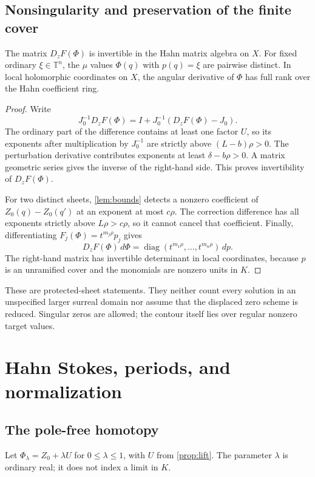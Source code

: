 \documentclass[11pt,letterpaper]{article}
\theoremstyle{definition}
\theoremstyle{remark}
\newcommand{\T}{\mathbb T}\newcommand{\D}{\mathbb D}
\numberwithin{equation}{section}
\begin{document}
\subsection{Nonsingularity and preservation of the finite cover}
\begin{corollary}\label{cor:sheets}
The matrix $D_zF(\Phi)$ is invertible in the Hahn matrix algebra on $X$.
For fixed ordinary $\xi\in\T^n$, the $\mu$ values $\Phi(q)$ with
$p(q)=\xi$ are pairwise distinct. In local holomorphic coordinates on $X$,
the angular derivative of $\Phi$ has full rank over the Hahn coefficient ring.
\end{corollary}
\begin{proof}
Write
\[
 J_0^{-1}D_zF(\Phi)=I+J_0^{-1}(D_zF(\Phi)-J_0).
\]
The ordinary part of the difference contains at least one factor $U$, so
its exponents after multiplication by $J_0^{-1}$ are strictly above
$(L-b)\rho>0$. The perturbation derivative contributes exponents at least
$\delta-b\rho>0$. A matrix geometric series gives the inverse of the
right-hand side. This proves invertibility of $D_zF(\Phi)$.

For two distinct sheets, \cref{lem:bounds} detects a nonzero coefficient of
$Z_0(q)-Z_0(q')$ at an exponent at most $c\rho$. The correction difference
has all exponents strictly above $L\rho>c\rho$, so it cannot cancel that
coefficient. Finally, differentiating $F_j(\Phi)=t^{m_j\rho}p_j$ gives
\[
 D_zF(\Phi)\,d\Phi
 =\operatorname{diag}(t^{m_1\rho},\ldots,t^{m_n\rho})\,dp.
\]
The right-hand matrix has invertible determinant in local coordinates, because
$p$ is an unramified cover and the monomials are nonzero units in $K$.
\end{proof}

These are protected-sheet statements. They neither count every solution in an
unspecified larger surreal domain nor assume that the displaced zero scheme is
reduced. Singular zeros are allowed; the contour itself lies over regular
nonzero target values.

\section{Hahn Stokes, periods, and normalization}
\label{sec:stokes}

\subsection{The pole-free homotopy}
Let $\Phi_\lambda=Z_0+\lambda U$ for $0\leq\lambda\leq1$, with $U$ from
\cref{prop:lift}. The parameter $\lambda$ is ordinary real; it does not index
a limit in $K$.
\end{document}
